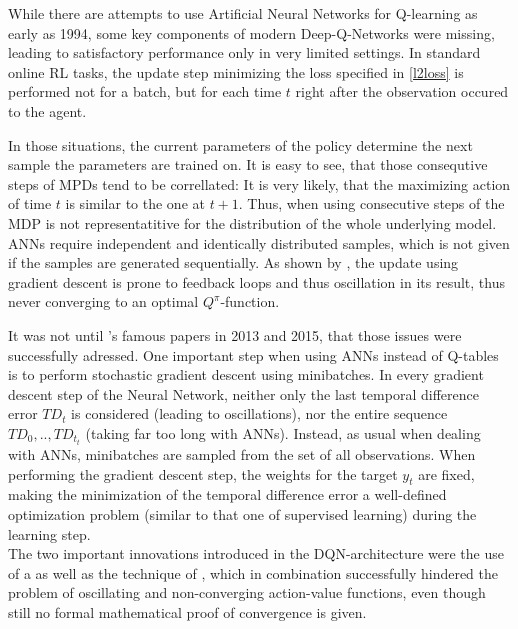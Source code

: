 While there are attempts to use Artificial Neural Networks for Q-learning as early as 1994\cite{rummery_-line_1994}, some key components of modern Deep-Q-Networks were missing, leading to satisfactory performance only in very limited settings. In standard online RL tasks, the update step minimizing the loss specified in \ref{l2loss} is performed not for a batch, but for each time $t$ right after the observation occured to the agent. 

In those situations, the current parameters of the policy determine the next sample the parameters are trained on. It is easy to see, that those consequtive steps of MPDs tend to be correllated: It is very likely, that the maximizing action of time $t$ is similar to the one at $t+1$. Thus, when using consecutive steps of the MDP is not representatitive for the distribution of the whole underlying model. ANNs require independent and identically distributed samples, which is not given if the samples are generated sequentially. As shown by \cite{john_n._tsitsiklis_analysis_1997}, the update using gradient descent is prone to feedback loops and thus oscillation in its result, thus never converging to an optimal $Q^\pi$-function. 

It was not until 's famous papers in 2013\cite{mnih_playing_2013} and 2015\cite{mnih_human-level_2015}, that those issues were successfully adressed. One important step when using ANNs instead of Q-tables is to perform stochastic gradient descent using minibatches. In every gradient descent step of the Neural Network, neither only the last temporal difference error $TD_t$ is considered (leading to oscillations), nor the entire sequence $TD_0, .., TD_{t_t}$ (taking far too long with ANNs). Instead, as usual when dealing with ANNs, minibatches are sampled from the set of all observations. When performing the gradient descent step, the weights for the target $y_t$ are fixed, making the minimization of the temporal difference error a well-defined optimization problem (similar to that one of supervised learning) during the learning step.\\


\noindent The two important innovations introduced in the DQN-architecture were the use of a  as well as the technique of , which in combination successfully hindered the problem of oscillating and non-converging action-value functions, even though still no formal mathematical proof of convergence is given. %

